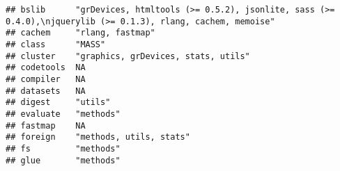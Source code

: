 \documentclass[
]{article}
\begin{document}
\begin{verbatim}
## bslib      "grDevices, htmltools (>= 0.5.2), jsonlite, sass (>= 0.4.0),\njquerylib (>= 0.1.3), rlang, cachem, memoise"                                                                                            
## cachem     "rlang, fastmap"                                                                                                                                                                                       
## class      "MASS"                                                                                                                                                                                                 
## cluster    "graphics, grDevices, stats, utils"                                                                                                                                                                    
## codetools  NA                                                                                                                                                                                                     
## compiler   NA                                                                                                                                                                                                     
## datasets   NA                                                                                                                                                                                                     
## digest     "utils"                                                                                                                                                                                                
## evaluate   "methods"                                                                                                                                                                                              
## fastmap    NA                                                                                                                                                                                                     
## foreign    "methods, utils, stats"                                                                                                                                                                                
## fs         "methods"                                                                                                                                                                                              
## glue       "methods"                                                                                                                                                                                              

\end{verbatim}
\end{document}
